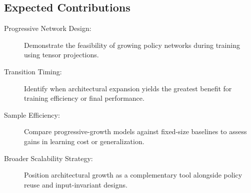 \subsection{Expected Contributions}
\begin{description}
    \item[Progressive Network Design:] Demonstrate the feasibility of growing 
        policy networks during training using tensor projections.
    \item[Transition Timing:] Identify when architectural expansion yields the 
        greatest benefit for training efficiency or final performance.
    \item[Sample Efficiency:] Compare progressive-growth models against fixed-size 
        baselines to assess gains in learning cost or generalization.
    \item[Broader Scalability Strategy:] Position architectural growth as a 
        complementary tool alongside policy reuse and input-invariant designs.
\end{description}